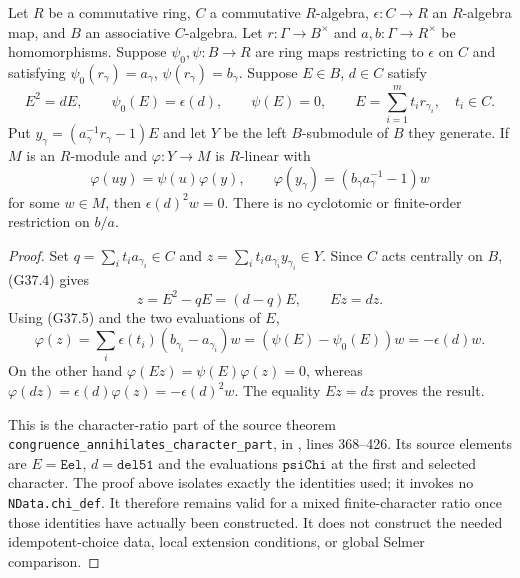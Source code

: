 \begin{lemma}
\label{AC-G37-ann}
Let $R$ be a commutative ring, $C$ a commutative $R$-algebra,
$\epsilon:C\to R$ an $R$-algebra map, and $B$ an associative
$C$-algebra.  Let $r:\Gamma\to B^\times$ and
$a,b:\Gamma\to R^\times$ be homomorphisms.
Suppose $\psi_0,\psi:B\to R$ are ring maps restricting
to $\epsilon$ on $C$ and satisfying
$\psi_0(r_\gamma)=a_\gamma$,
$\psi(r_\gamma)=b_\gamma$.
Suppose $E\in B$, $d\in C$ satisfy
\[
 E^2=dE,\qquad \psi_0(E)=\epsilon(d),\qquad \psi(E)=0,
 \qquad E=\sum_{i=1}^m t_i r_{\gamma_i},\quad t_i\in C.
                                                               \tag{G37.4}
\]
Put $y_\gamma=(a_\gamma^{-1}r_\gamma-1)E$ and let $Y$
be the left $B$-submodule of $B$ they generate.
If $M$ is an $R$-module and $\varphi:Y\to M$ is
$R$-linear with
\[
 \varphi(uy)=\psi(u)\varphi(y),\qquad
 \varphi(y_\gamma)=(b_\gamma a_\gamma^{-1}-1)w
                                                               \tag{G37.5}
\]
for some $w\in M$, then $\epsilon(d)^2w=0$.
There is no cyclotomic or finite-order restriction on $b/a$.
\end{lemma}
\begin{proof}
Set $q=\sum_i t_i a_{\gamma_i}\in C$ and
$z=\sum_i t_i a_{\gamma_i}y_{\gamma_i}\in Y$.
Since $C$ acts centrally on $B$, (G37.4) gives
\[
                 z=E^2-qE=(d-q)E,\qquad Ez=dz.
\]
Using (G37.5) and the two evaluations of $E$,
\[
 \varphi(z)=\sum_i\epsilon(t_i)(b_{\gamma_i}-a_{\gamma_i})w
           =(\psi(E)-\psi_0(E))w=-\epsilon(d)w.
\]
On the other hand $\varphi(Ez)=\psi(E)\varphi(z)=0$,
whereas $\varphi(dz)=\epsilon(d)\varphi(z)
=-\epsilon(d)^2w$.  The equality $Ez=dz$ proves the result.

This is the character-ratio part of the source theorem
\texttt{congruence\_annihilates\_character\_part}, in
, lines
368--426.  Its source elements are $E=\texttt{Eel}$,
$d=\texttt{del51}$ and the evaluations
$\texttt{psiChi}$ at the first and selected character.
The proof above isolates exactly the identities used;
it invokes no \texttt{NData.chi\_def}.
It therefore remains valid for a mixed finite-character
ratio once those identities have actually been constructed.
It does not construct the needed idempotent-choice data,
local extension conditions, or global Selmer comparison.
\end{proof}

